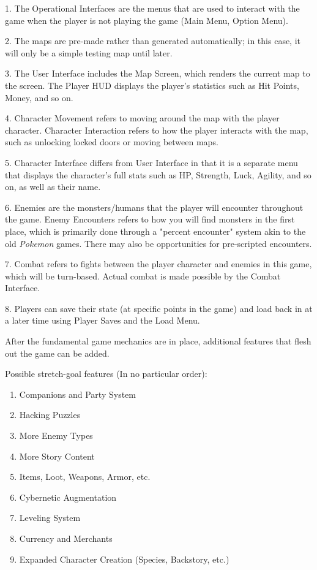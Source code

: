 \documentclass[10pt,conference,onecolumn,compsoc]{IEEEtran}
\begin{document}
\begin{flushleft}
1. The Operational Interfaces are the menus that are used to interact with the game when the player is not playing the game (Main Menu, Option Menu).

2. The maps are pre-made rather than generated automatically; in this case, it will only be a simple testing map until later.

3. The User Interface includes the Map Screen, which renders the current map to the screen. The Player HUD displays the player's statistics such as Hit Points, Money, and so on.

4. Character Movement refers to moving around the map with the player character. Character Interaction refers to how the player interacts with the map, such as unlocking locked doors or moving between maps.

5. Character Interface differs from User Interface in that it is a separate menu that displays the character's full stats such as HP, Strength, Luck, Agility, and so on, as well as their name.

6. Enemies are the monsters/humans that the player will encounter throughout the game. Enemy Encounters refers to how you will find monsters in the first place, which is primarily done through a "percent encounter" system akin to the old \textit{Pokemon} games. There may also be opportunities for pre-scripted encounters.

7. Combat refers to fights between the player character and enemies in this game, which will be turn-based. Actual combat is made possible by the Combat Interface.

8. Players can save their state (at specific points in the game) and load back in at a later time using Player Saves and the Load Menu.
\end{flushleft}

After the fundamental game mechanics are in place, additional features that flesh out the game can be added.

Possible stretch-goal features (In no particular order):
\begin{enumerate}
\item Companions and Party System
\item Hacking Puzzles
\item More Enemy Types
\item More Story Content
\item Items, Loot, Weapons, Armor, etc.
\item Cybernetic Augmentation
\item Leveling System
\item Currency and Merchants
\item Expanded Character Creation (Species, Backstory, etc.)
\end{enumerate}
\end{document}
